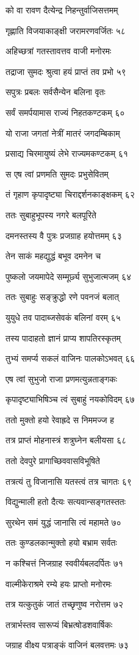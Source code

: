को वा रावण दैत्येन्द्र निहन्तुर्वाजिसत्तमम्

गृह्णाति विजयाकाङ्क्षी जरामरणवर्जितः ५८

अहिच्छत्रां गतस्तावत्तव वाजी मनोरमः

तद्राजा सुमदः श्रुत्वा हयं प्राप्तं तव प्रभो ५९

सपुत्रः प्रबलः सर्वसैन्येन बलिना वृतः

सर्वं समर्पयामास राज्यं निहतकण्टकम् ६०

यो राजा जगतां नेत्रीं मातरं जगदम्बिकाम्

प्रसाद्य चिरमायुष्यं लेभे राज्यमकण्टकम् ६१

स एष त्वां प्रणमति सुमदः प्रभुसेवितम्

तं गृहाण कृपादृष्ट्या चिराद्दर्शनकाङ्क्षकम् ६२

ततः सुबाहुभूपस्य नगरे बलपूरिते

दमनस्तस्य वै पुत्रः प्रजग्राह हयोत्तमम् ६३

तेन साकं महद्युद्धं बभूव दमनेन च

पुष्कलो जयमापेदे सम्मूर्छ्य सुभुजात्मजम् ६४

ततः सुबाहुः सङ्क्रुद्धो रणे पवनजं बलात्

युयुधे तव पादाब्जसेवकं बलिनां वरम् ६५

तस्य पादाहतो ज्ञानं प्राप्य शापतिरस्कृतम्

तुभ्यं समर्प्य सकलं वाजिनः पालकोऽभवत् ६६

एष त्वां सुभुजो राजा प्रणमत्युन्नताङ्गकः

कृपादृष्ट्याभिषिञ्च त्वं सुबाहुं नयकोविदम् ६७

ततो मुक्तो हयो रेवाह्रदे स निममज्ज ह

तत्र प्राप्तं मोहनास्त्रं शत्रुघ्नेन बलीयसा ६८

ततो देवपुरे प्रागाच्छिववासविभूषिते

तत्रत्यं तु विजानासि यतस्त्वं तत्र चागतः ६९

विद्युन्माली हतो दैत्यः सत्यवान्सङ्गतस्ततः

सुरथेन समं युद्धं जानासि त्वं महामते ७०

ततः कुण्डलकान्मुक्तो हयो बभ्राम सर्वतः

न कश्चित्तं निजग्राह स्ववीर्यबलदर्पितः ७१

वाल्मीकेराश्रमे रम्ये हयः प्राप्तो मनोरमः

तत्र यत्कुतुकं जातं तच्छृणुष्व नरोत्तम ७२

तत्रार्भस्तव सारूप्यं बिभ्रत्षोडशवार्षिकः

जग्राह वीक्ष्य पत्राङ्कं वाजिनं बलवत्तमः ७३

